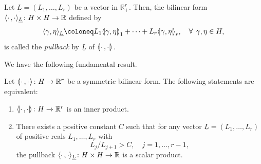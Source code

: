 \documentclass[AHL,Unicode,longabstracts]{cedram}
\newcommand{\innone}[2]{{\langle#2\rangle_{#1}}}
\newcommand{\llangle}{\mathopen{\langle\mkern -3.1mu\lvert}}
\newcommand{\rrangle}{\mathclose{\rvert\mkern -3.1mu\rangle}}
\newcommand{\highinn}[2]{{\llangle#2\rrangle_{#1}}}
\newcommand{\R}{\mathbb{R}}
\renewcommand*{\to}{\mathchoice{\longrightarrow}{\rightarrow}{\rightarrow}{\rightarrow}}
\newcommand*{\relabel}{\renewcommand{\labelenumi}{(\theenumi)}}
\newcommand*{\romanenumi}{\renewcommand*{\theenumi}{\roman{enumi}}\relabel}
\let\oldforall\forall
\renewcommand*{\forall}{\mathrel{\oldforall}}
\begin{document}
\begin{defi} \label{defi:PullbackBilinearForm}
Let $\underline L=(L_1, \dots, L_r)$ be a vector in $\R_+^r$. Then, the bilinear form $\innone{{\underline L}}{\cdot\,, \cdot} \colon H \times H \to \R$ defined by
\begin{align*}
\innone{{\underline L}}{\gamma, \eta} \coloneq L_1 {\highinn{1}{\gamma, \eta}} + \dots + L_r{\highinn{r}{\gamma, \eta}},
\quad \forall\, \gamma, \eta\in H,
\end{align*}
is called the \emph{pullback} by $\underline L$ of $\highinn{}{\cdot\,, \cdot}$.%
\end{defi}

We have the following fundamental result.

\begin{theo}\label{thm:pullback}
Let $\highinn{}{\cdot\,, \cdot} \colon H \to \R^r$ be a symmetric bilinear form. The following statements are equivalent:
\begin{enumerate}\romanenumi
\item\label{theo2.13.1} $\highinn{}{\cdot\,, \cdot} \colon H \to \R^r$ is an inner product.

\item\label{theo2.13.2} There exists a positive constant $C$ such that for any vector $\underline L = (L_1, \dots, L_r)$ of positive reals $L_1, \dots, L_r$ with
\[
L_j/L_{j+1}> C, \quad j=1, \dots, r-1,
\]
the pullback $\innone{\underline L}{\cdot\,, \cdot}\colon H\times H \to \R$ is a scalar product.
\end{enumerate}
\end{theo}
\end{document}
